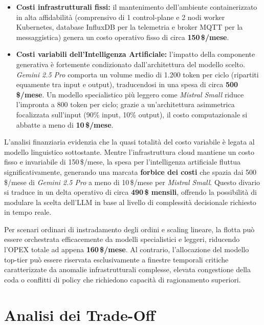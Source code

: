 \begin{itemize}
    \item \textbf{Costi infrastrutturali fissi:} il mantenimento dell'ambiente containerizzato in alta affidabilità (comprensivo di 1 control-plane e 2 nodi worker Kubernetes, database InfluxDB per la telemetria e broker MQTT per la messaggistica) genera un costo operativo fisso di circa \textbf{150\,\$/mese}.
    \item \textbf{Costi variabili dell'Intelligenza Artificiale:} l'impatto della componente generativa è fortemente condizionato dall'architettura del modello scelto. \textit{Gemini 2.5 Pro} comporta un volume medio di 1.200 token per ciclo (ripartiti equamente tra input e output), traducendosi in una spesa di circa \textbf{500\,\$/mese}. Un modello specialistico più leggero come \textit{Mistral Small} riduce l'impronta a 800 token per ciclo; grazie a un'architettura asimmetrica focalizzata sull'input (90\% input, 10\% output), il costo computazionale si abbatte a meno di \textbf{10\,\$/mese}.
\end{itemize}

L'analisi finanziaria evidenzia che la quasi totalità del costo variabile è legata al modello linguistico sottostante. Mentre l'infrastruttura cloud mantiene un costo fisso e invariabile di 150\,\$/mese, la spesa per l'intelligenza artificiale fluttua significativamente, generando una marcata \textbf{forbice dei costi} che spazia dai 500\,\$/mese di \textit{Gemini 2.5 Pro} a meno di 10\,\$/mese per \textit{Mistral Small}. Questo divario si traduce in un delta operativo di circa \textbf{490\,\$ mensili}, offrendo la possibilità di modulare la scelta dell'LLM in base al livello di complessità decisionale richiesto in tempo reale.

Per scenari ordinari di instradamento degli ordini e scaling lineare, la flotta può essere orchestrata efficacemente da modelli specialistici e leggeri, riducendo l'OPEX totale ad appena \textbf{160\,\$/mese}. Al contrario, l'allocazione del modello top-tier può essere riservata esclusivamente a finestre temporali critiche caratterizzate da anomalie infrastrutturali complesse, elevata congestione della coda o conflitti di policy che richiedono capacità di ragionamento superiori.

\section{Analisi dei Trade-Off}
\label{sec:analisi_tradeoff}

